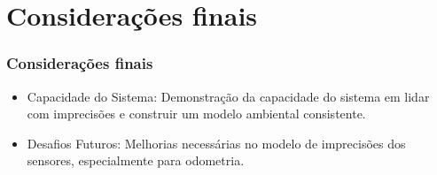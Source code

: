 \documentclass[xcolor=dvipsnames, aspectratio=169]{beamer}
\begin{document}
\section{Considerações finais}
  \begin{frame}
  \frametitle{Considerações finais}
  \begin{itemize}
      \item Capacidade do Sistema: Demonstração da capacidade do sistema em lidar com imprecisões e construir um modelo ambiental consistente.
      \item Desafios Futuros: Melhorias necessárias no modelo de imprecisões dos sensores, especialmente para odometria.
  \end{itemize}
  \end{frame}

\begin{frame}
    \printbibliography
\end{frame}


\begin{frame}
\titlepage %
\end{frame}
\end{document}

